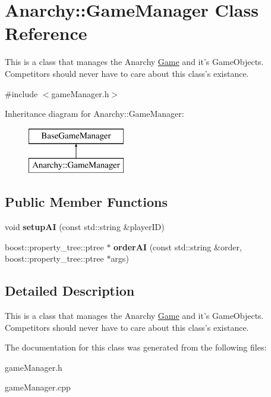 \hypertarget{classAnarchy_1_1GameManager}{\section{Anarchy\-:\-:Game\-Manager Class Reference}
\label{classAnarchy_1_1GameManager}
}


This is a class that manages the Anarchy \hyperlink{classAnarchy_1_1Game}{Game} and it's Game\-Objects. Competitors should never have to care about this class's existance.  




{\ttfamily \#include $<$game\-Manager.\-h$>$}

Inheritance diagram for Anarchy\-:\-:Game\-Manager\-:\begin{figure}[H]
\begin{center}
\leavevmode
\includegraphics[height=2.000000cm]{classAnarchy_1_1GameManager}
\end{center}
\end{figure}
\subsection*{Public Member Functions}
\begin{DoxyCompactItemize}
\item 
\hypertarget{classAnarchy_1_1GameManager_a2c0754340cb44a6f84afdd92dbf85d08}{void {\bfseries setup\-A\-I} (const std\-::string \&player\-I\-D)}\label{classAnarchy_1_1GameManager_a2c0754340cb44a6f84afdd92dbf85d08}

\item 
\hypertarget{classAnarchy_1_1GameManager_a77f7032331fb9326b5cf6ab6e8a232e4}{boost\-::property\-\_\-tree\-::ptree $\ast$ {\bfseries order\-A\-I} (const std\-::string \&order, boost\-::property\-\_\-tree\-::ptree $\ast$args)}\label{classAnarchy_1_1GameManager_a77f7032331fb9326b5cf6ab6e8a232e4}

\end{DoxyCompactItemize}


\subsection{Detailed Description}
This is a class that manages the Anarchy \hyperlink{classAnarchy_1_1Game}{Game} and it's Game\-Objects. Competitors should never have to care about this class's existance. 



The documentation for this class was generated from the following files\-:\begin{DoxyCompactItemize}
\item 
game\-Manager.\-h\item 
game\-Manager.\-cpp\end{DoxyCompactItemize}
